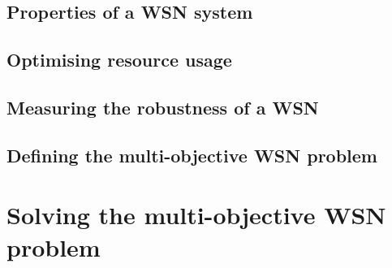 \documentclass[a4paper,fleqn]{cas-sc}
\begin{document}
		\subsection{Properties of a WSN system}
		
		
		
		
		
		
		
		
		
	\subsection{Optimising resource usage}
	\label{section:optimising_resource_usage}
	
	
	
	
	
	
	
	
	\subsection{Measuring the robustness of a WSN}
	
	\subsection{Defining the multi-objective WSN problem }
	
\section{Solving the multi-objective WSN problem}
\label{section:solution}
	
	
	
	
	

	
	
	
	
	
	
	
	\FloatBarrier
	\newpage
	\begin{appendix}
\label{appendix:algorithms}
%	

			

%	

	\FloatBarrier
	
	\end{appendix}
				
\end{document}
